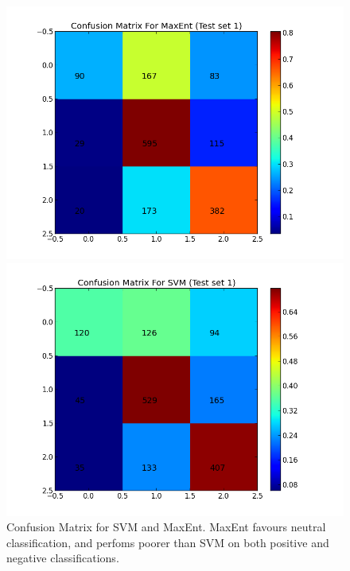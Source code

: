 \begin{figure}[!htb]
	\centering
	\begin{minipage}{.45\linewidth}
		\includegraphics[width=\linewidth]{../img/plots/analysis/maxent_confusion_matrix_best.png}
	\end{minipage}
	\hspace{0.05\linewidth}
	\begin{minipage}{.45\linewidth}
		\includegraphics[width=\linewidth]{../img/plots/analysis/svm_confusion_matrix_best.png}
	\end{minipage}
	\caption[Confusion Matrix for SVM and MaxEnt]{Confusion Matrix for SVM and MaxEnt. MaxEnt favours neutral classification, and perfoms poorer than SVM on both positive and negative classifications.}
	\label{fig:best_result_confusion}
\end{figure}

